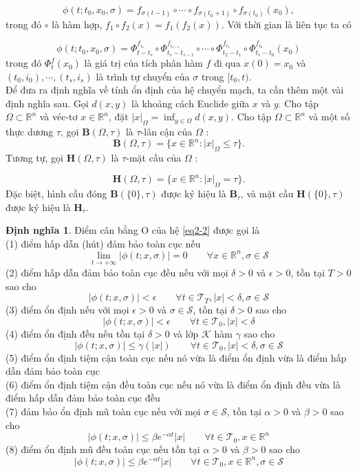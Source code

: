 \documentclass[14pt,a4paper,oneside]{report}		%
\theoremstyle{definition}
\newtheorem{define}[theorem]{Định nghĩa}
\begin{document}
\begin{equation} \label{eq2-4}
\phi (t;t_0,x_0,\sigma)=f_{\sigma (t-1)}\circ \cdots \circ f_{\sigma (t_0+1)}\circ f_{\sigma (t_0)}(x_0),
\end{equation}
trong đó $\circ$ là hàm hợp, $f_1 \circ f_2(x) = f_1(f_2(x))$. Với thời gian là liên tục ta có

\begin{equation} \label{eq2-5}
\phi (t;t_0,x_0,\sigma )=\Phi^{f_{i_s}}_{t-t_s}\circ\Phi^{f_{i_{s-1}}}_{t_s-t_{s-1}}\circ\cdots\circ\Phi^{f_{i_{1}}}_{t_2-t_{1}}\circ\Phi^{f_{i_{0}}}_{t_1-t_{0}}(x_0)
\end{equation}
trong đó $\Phi^f_t(x_0)$ là giá trị của tích phân hàm $f$ đi qua $x(0)=x_0$ và $(t_0,i_0),\cdots ,(t_s,i_s)$ là trình tự chuyển của $\sigma$ trong $[t_0,t)$.\\
Để đưa ra định nghĩa về tính ổn định của hệ chuyển mạch, ta cần thêm một vài định nghĩa sau. Gọi $d(x,y)$ là khoảng cách Euclide giữa $x$ và $y$. Cho tập $\Omega \subset\mathbb{R}^n$ và véc-tơ $x\in\mathbb{R}^n$, đặt $|x|_\Omega = \inf_{y\in\Omega}d(x,y)$. Cho tập $\Omega\subset\mathbb{R}^n$ và một số thực dương $\tau$, gọi $\mathbf{B}(\Omega , \tau)$ là $\tau$-lân cận của $\Omega$ :
$$\mathbf{B}(\Omega,\tau)=\{x\in\mathbb{R}^n:|x|_\Omega\leq\tau\}.$$
Tương tự, gọi $\mathbf{H}(\Omega,\tau)$ là $\tau$-mặt cầu của $\Omega$ :

$$\mathbf{H}(\Omega,\tau)=\{x\in\mathbb{R}^n:|x|_\Omega=\tau\}.$$
Đặc biệt, hình cầu đóng $\mathbf{B}(\{0\},\tau)$ được ký hiệu là $\mathbf{B}_\tau$, và mặt cầu $\mathbf{H}(\{0\},\tau)$ được ký hiệu là $\mathbf{H}_\tau$.

\begin{define} \label{def2-1}
Điểm cân bằng O của hệ \ref{eq2-2} được gọi là\\
(1) điểm hấp dẫn (hút) đảm bảo toàn cục nếu
$$\lim_{t\rightarrow +\infty}|\phi (t;x,\sigma)|=0\qquad\forall x\in\mathbb{R}^n, \sigma\in\mathcal{S}$$
(2) điểm hấp dẫn đảm bảo toàn cục đều nếu với mọi $\delta >0$ và $\epsilon >0$, tồn tại $T>0$ sao cho
$$|\phi (t;x,\sigma)|<\epsilon\qquad\forall t\in\mathcal{T}_T, |x|<\delta,\sigma\in\mathcal{S}$$
(3) điểm ổn định nếu với mọi $\epsilon > 0$ và $\sigma\in\mathcal{S}$, tồn tại $\delta >0$ sao cho
$$|\phi (t;x,\sigma)|<\epsilon\qquad\forall t\in\mathcal{T}_0, |x|<\delta$$
(4) điểm ổn định đều nếu tồn tại $\delta > 0$ và lớp $\mathcal{K}$ hàm $\gamma$ sao cho
$$|\phi (t;x,\sigma)|\leq \gamma(|x|)\qquad\forall t\in\mathcal{T}_0, |x|<\delta,\sigma\in\mathcal{S}$$
(5) điểm ổn định tiệm cận toàn cục nếu nó vừa là điểm ổn định vừa là điểm hấp dẫn đảm bảo toàn cục\\
(6) điểm ổn định tiệm cận đều toàn cục nếu nó vừa là điểm ổn định đều vừa là điểm hấp dẫn đảm bảo toàn cục đều\\
(7) đảm bảo ổn định mũ toàn cục nếu với mọi $\sigma\in\mathcal{S}$, tồn tại $\alpha>0$ và $\beta >0$ sao cho
$$|\phi (t;x,\sigma)|\leq \beta e^{-\alpha t}|x|\qquad\forall t\in\mathcal{T}_0, x\in\mathbb{R}^n$$
(8) điểm ổn định mũ đều toàn cục nếu tồn tại $\alpha>0$ và $\beta >0$ sao cho
$$|\phi (t;x,\sigma)|\leq \beta e^{-\alpha t}|x|\qquad\forall t\in\mathcal{T}_0, x\in\mathbb{R}^n, \sigma\in\mathcal{S}$$
\end{define}
\end{document}
